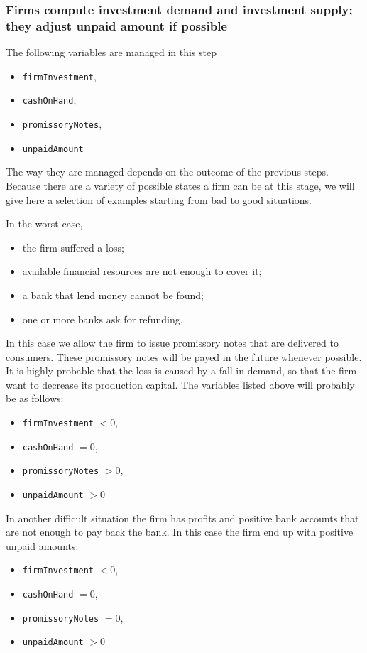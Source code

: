 \documentclass{book}
\begin{document}
\subsubsection{Firms compute investment demand and investment supply; they adjust unpaid amount if possible}

The following variables are managed in this step
\begin{itemize}
	\item \verb+firmInvestment+,
	\item \verb+cashOnHand+,
	\item \verb+promissoryNotes+,
	\item \verb+unpaidAmount+
\end{itemize}


The way they are managed depends on the outcome of the previous steps. 
Because there are a variety of possible states a firm can be at this stage, we will give here a selection of examples starting from bad to good situations. 

In the worst case, 
\begin{itemize}
	\item the firm suffered a loss;
	\item available financial resources are not enough to cover it;
	\item a bank that lend money cannot be found;
	\item one or more banks ask for refunding.
\end{itemize}
In this case we allow the firm to issue promissory notes that are delivered to consumers. These promissory notes will be payed in the future whenever possible.
It is highly probable that the loss is caused by a fall in demand, so that the firm want to decrease its production capital. 
The variables listed above will probably be as follows:
\begin{itemize}
	\item \verb+firmInvestment+ $<0$, 
	\item \verb+cashOnHand+ $=0$, 
	\item \verb+promissoryNotes+ $>0$, 
	\item\verb+unpaidAmount+ $>0$
\end{itemize}

In another difficult situation the firm has profits and positive bank accounts that are not enough to pay back the bank. In this case the firm end up with positive unpaid amounts:\\
\begin{itemize}
	\item \verb+firmInvestment+ $<0$, 
		\item \verb+cashOnHand+ $=0$,
			\item \verb+promissoryNotes+ $=0$,
				\item \verb+unpaidAmount+ $>0$
\end{itemize}
\end{document}

